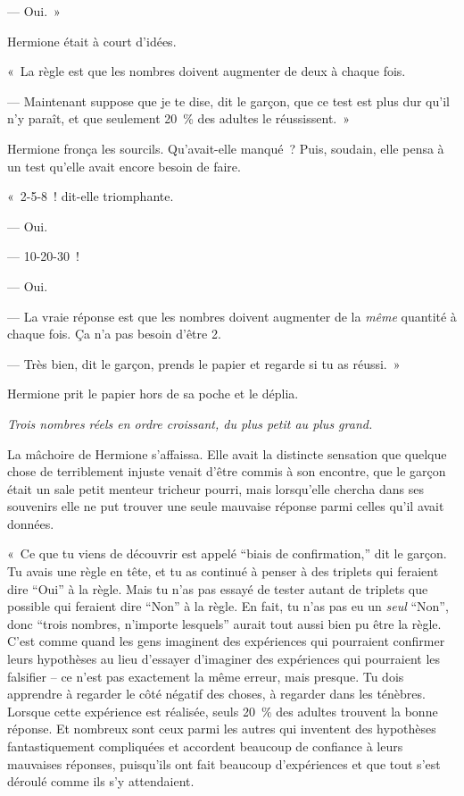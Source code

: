 --- Oui.~»

Hermione était à court d'idées.

«~La règle est que les nombres doivent augmenter de deux à chaque fois.

--- Maintenant suppose que je te dise, dit le garçon, que ce test est plus dur qu'il n'y paraît, et que seulement 20~\% des adultes le réussissent.~»

Hermione fronça les sourcils. Qu'avait-elle manqué~? Puis, soudain, elle pensa à un test qu'elle avait encore besoin de faire.

«~2-5-8~! dit-elle triomphante.

--- Oui.

--- 10-20-30~!

--- Oui.

--- La vraie réponse est que les nombres doivent augmenter de la \emph{même} quantité à chaque fois. Ça n'a pas besoin d'être 2.

--- Très bien, dit le garçon, prends le papier et regarde si tu as réussi.~»

Hermione prit le papier hors de sa poche et le déplia.

\emph{Trois nombres réels en ordre croissant, du plus petit au plus grand.}

La mâchoire de Hermione s'affaissa. Elle avait la distincte sensation que quelque chose de terriblement injuste venait d'être commis à son encontre, que le garçon était un sale petit menteur tricheur pourri, mais lorsqu'elle chercha dans ses souvenirs elle ne put trouver une seule mauvaise réponse parmi celles qu'il avait données.

«~Ce que tu viens de découvrir est appelé “biais de confirmation,” dit le garçon. Tu avais une règle en tête, et tu as continué à penser à des triplets qui feraient dire “Oui” à la règle. Mais tu n'as pas essayé de tester autant de triplets que possible qui feraient dire “Non” à la règle. En fait, tu n'as pas eu un \emph{seul} “Non”, donc “trois nombres, n'importe lesquels” aurait tout aussi bien pu être la règle. C'est comme quand les gens imaginent des expériences qui pourraient confirmer leurs hypothèses au lieu d'essayer d'imaginer des expériences qui pourraient les falsifier -- ce n'est pas exactement la même erreur, mais presque. Tu dois apprendre à regarder le côté négatif des choses, à regarder dans les ténèbres. Lorsque cette expérience est réalisée, seuls 20~\% des adultes trouvent la bonne réponse. Et nombreux sont ceux parmi les autres qui inventent des hypothèses fantastiquement compliquées et accordent beaucoup de confiance à leurs mauvaises réponses, puisqu'ils ont fait beaucoup d'expériences et que tout s'est déroulé comme ils s'y attendaient.

